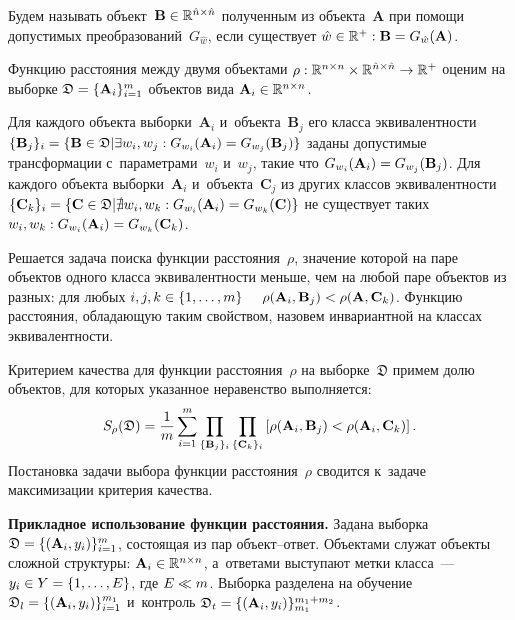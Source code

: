 \begin{multicols}{2}
Будем называть объект~$\textbf{B} \hm\in \mathbb{R}^{\hat{n} \times \hat{n}}$ 
полученным из объекта~$\textbf{A}$ при помощи допустимых 
преобразований~$G_{\hat{w}}$, если существует $\hat{w}\hm\in \mathbb{R}^+ : 
\textbf{B} \hm= G_{\hat{w}}(\textbf{A})$.

Функцию расстояния между двумя объектами $\rho: 
\mathbb{R}^{{n} \times {n}} \times \mathbb{R}^{\hat{n} \times \hat{n}} 
\hm\rightarrow  \mathbb{R}^+$ оценим на выборке $\mathfrak{D } \hm= 
\{ \textbf{A}_i \}_{i=1}^m$ объектов вида $\textbf{A}_i \hm\in 
\mathbb{R}^{n \times n}$.

Для каждого объекта выборки~$\textbf{A}_i$ и~объекта~$\textbf{B}_j$ его 
класса эквивалентности $\{\textbf{B}_j\}_i \hm= \{  \textbf{B} 
\hm\in \mathfrak{D} | \exists w_i,w_j: G_{w_i}(\textbf{A}_i) \hm= G_{w_j}
(\textbf{B}_j)   \}$ заданы допустимые трансформации с~параметрами~$w_i$ 
и~$w_j$, такие что $G_{w_i}(\textbf{A}_i)\hm = G_{w_j}(\textbf{B}_j)$. 
Для каждого объекта выборки~$\textbf{A}_i$ и~объекта~$\textbf{C}_j$ 
из других классов эквивалентности $\{ \textbf{C}_k\}_i \hm= 
\{  \textbf{C} \hm\in \mathfrak{D} | \nexists w_i,w_k: G_{w_i}(\textbf{A}_i)
\hm = G_{w_k}(\textbf{C})   \}$ не существует таких $ w_i, w_k : G_{w_i}
(\textbf{A}_i) \hm= G_{w_k}(\textbf{C}_k)$.

Решается задача поиска функции расстояния~$\rho$, значение
 которой на паре объектов одного класса эквивалентности меньше, 
 чем на любой паре объектов из разных: для любых $i,j,k \hm\in 
 \{1,\dots,m\}$ $\quad \rho(\textbf{A}_i,\textbf{B}_j) \hm< 
 \rho(\textbf{A},\textbf{C}_k)$. Функцию расстояния, обладающую 
 таким свойством, назовем инвариантной на классах эквивалентности.

Критерием качества для функции расстояния~$\rho$ на выборке~$\mathfrak{D}$ 
примем долю объектов, для которых указанное неравенство выполняется:
$$
S_{\rho}(\mathfrak{D}) = \displaystyle\frac{\displaystyle 1\mathstrut}{\displaystyle m\mathstrut} \sum\limits_{i=1}^m 
\prod\limits_{\{ \textbf{B}_j\}_i} 
\prod\limits_{\{ \textbf{C}_k\}_i}  
\left[  \rho(\textbf{A}_i,\textbf{B}_j) < \rho(\textbf{A}_i,\textbf{C}_k)  
 \right].
 $$
Постановка задачи выбора функции расстояния~$\rho$ 
сводится к~задаче максимизации критерия качества.

\textbf{Прикладное использование функции расстояния.}
Задана выборка $\mathfrak{D}\hm = \{(\textbf{A}_i,y_i)\}^m_{i=1}$, 
состоящая из пар объ\-ект--от\-вет. Объектами служат объекты сложной 
структуры: $\textbf{A}_i\hm \in \mathbb{R}^{n\times n}$, 
а~ответами выступают метки класса~---~$y_i\hm \in Y \hm= \{1,\ldots,E\}$, 
где $E \hm\ll m$. Выборка разделена на обучение $\mathfrak{D}_l \hm= 
\{(\textbf{A}_i,y_i)\}^{m_1}_{i=1}$ и~контроль $\mathfrak{D}_t \hm= 
\{(\textbf{A}_i,y_i)\}_{m_1}^{m_1+m_2}$.


\end{multicols}
